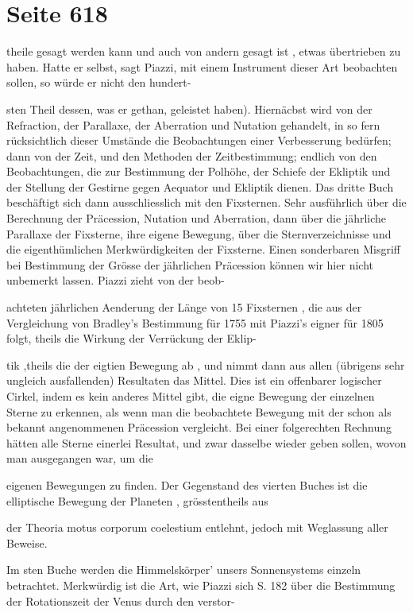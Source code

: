 \documentclass[10pt,a4paper]{article}
\begin{document}
\newpage
\section*{Seite 618}
theile gesagt werden kann und auch von andern gesagt ist , etwas übertrieben zu haben. Hatte er selbst, sagt Piazzi, mit einem Instrument dieser Art beobachten sollen, so würde er nicht den hundert-

sten Theil dessen, was er gethan, geleistet haben). Hiernäcbst wird von der Refraction, der Parallaxe, der Aberration und Nutation gehandelt, in so fern rücksichtlich dieser Umstände die Beobachtungen einer Verbesserung bedürfen; dann von der Zeit, und den Methoden der Zeitbestimmung; endlich von den Beobachtungen, die zur Bestimmung der Polhöhe, der Schiefe der Ekliptik und der Stellung der Gestirne gegen Aequator und Ekliptik dienen. Das dritte Buch beschäftigt sich dann ausschliesslich mit den Fixsternen. Sehr ausführlich über die Berechnung der Präcession, Nutation und Aberration, dann über die jährliche Parallaxe der Fixsterne, ihre eigene Bewegung, über die Sternverzeichnisse und die eigenthümlichen Merkwürdigkeiten der Fixsterne. Einen sonderbaren Misgriff bei Bestimmung der Grösse der jährlichen Präcession können wir hier nicht unbemerkt lassen. Piazzi zieht von der beob-

achteten jährlichen Aenderung der Länge von 15 Fixsternen , die aus der Vergleichung von Bradley's Bestimmung für 1755 mit Piazzi's eigner für 1805 folgt, theils die Wirkung der Verrückung der Eklip-

tik ,theils die der eigtien Bewegung ab , und nimmt dann aus allen (übrigens sehr ungleich ausfallenden) Resultaten das Mittel. Dies ist ein offenbarer logischer Cirkel, indem es kein anderes Mittel gibt, die eigne Bewegung der einzelnen Sterne zu erkennen, als wenn man die beobachtete Bewegung mit der schon als bekannt angenommenen Präcession vergleicht. Bei einer folgerechten Rechnung hätten alle Sterne einerlei Resultat, und zwar dasselbe wieder geben sollen, wovon man ausgegangen war, um die

eigenen Bewegungen zu finden. Der Gegenstand des vierten Buches ist die elliptische Bewegung der Planeten , grösstentheils aus

der Theoria motus corporum coelestium entlehnt, jedoch mit Weglassung aller Beweise.

Im sten Buche werden die Himmelskörper' unsers Sonnensystems einzeln betrachtet. Merkwürdig ist die Art, wie Piazzi sich S. 182 über die Bestimmung der Rotationszeit der Venus durch den verstor-
\end{document}
